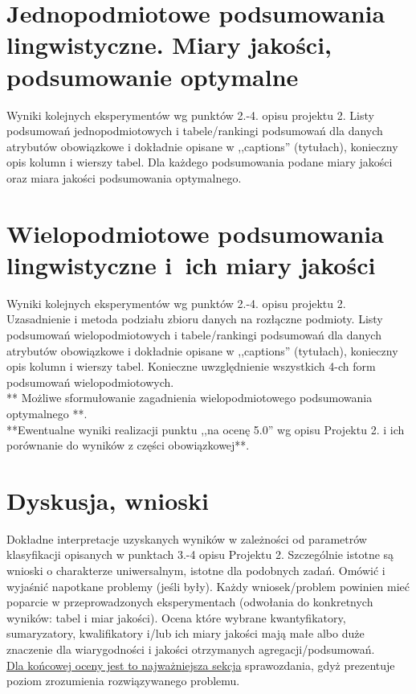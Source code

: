 \documentclass{classrep}
\begin{document}
\section{ Jednopodmiotowe podsumowania lingwistyczne. Miary jakości, podsumowanie optymalne}
Wyniki kolejnych eksperymentów wg punktów 2.-4. opisu projektu 2.  Listy podsumowań
jednopodmiotowych i tabele/rankingi podsumowań dla danych atrybutów obowiązkowe i dokładnie opisane w ,,captions'' (tytułach), konieczny opis kolumn i wierszy tabel. Dla każdego podsumowania podane miary jakości oraz miara jakości podsumowania
optymalnego.\\



\section{Wielopodmiotowe podsumowania lingwistyczne i~ich miary jakości} 
Wyniki kolejnych eksperymentów wg punktów 2.-4. opisu projektu 2. Uzasadnienie i
metoda podziału zbioru danych na rozłączne podmioty. Listy podsumowań
wielopodmiotowych i tabele/rankingi podsumowań dla danych atrybutów obowiązkowe i
dokładnie opisane w ,,captions'' (tytułach), konieczny opis kolumn i wierszy tabel.
Konieczne uwzględnienie wszystkich 4-ch form podsumowań wielopodmiotowych. 
\\ 

** Możliwe sformułowanie zagadnienia wielopodmiotowego podsumowania optymalnego **.\\

{**Ewentualne wyniki realizacji punktu ,,na ocenę 5.0'' wg opisu Projektu 2. i ich porównanie do wyników z
części obowiązkowej**.}\\



\section{Dyskusja, wnioski}
Dokładne interpretacje uzyskanych wyników w zależności od parametrów klasyfikacji
opisanych w punktach 3.-4 opisu Projektu 2. 
Szczególnie istotne są wnioski o charakterze uniwersalnym, istotne dla podobnych zadań. 
Omówić i wyjaśnić napotkane problemy (jeśli były). Każdy wniosek/problem powinien mieć poparcie
w przeprowadzonych eksperymentach (odwołania do konkretnych wyników: tabel i miar
jakości). Ocena które wybrane kwantyfikatory, sumaryzatory, kwalifikatory i/lub ich
miary jakości mają małe albo duże znaczenie dla wiarygodności i jakości otrzymanych
agregacji/podsumowań.  \\
\underline{Dla końcowej oceny jest to najważniejsza sekcja} sprawozdania, gdyż prezentuje poziom
zrozumienia rozwiązywanego problemu.\\
\end{document}
